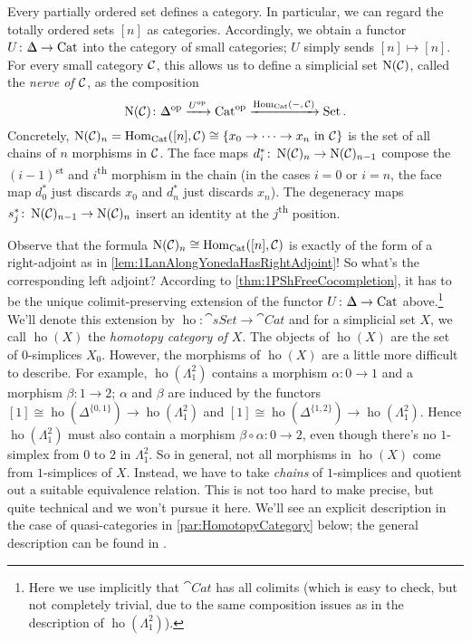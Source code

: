 \begin{numpar}\label{par:Nerve}
	Every partially ordered set defines a category. In particular, we can regard the totally ordered sets $[n]$ as categories. Accordingly, we obtain a functor $U\colon \IDelta\rightarrow \cat{Cat}$ into the category of small categories; $U$ simply sends $[n]\mapsto [n]$. For every small category $\mathcal{C}$, this allows us to define a simplicial set $\operatorname{N}(\mathcal{C})$, called the \emph{nerve of $\mathcal{C}$}, as the composition
	\begin{equation*}
		\N(\Cc)\colon \IDelta^\op\xrightarrow{U^\op}\cat{Cat}^\op\xrightarrow{\Hom_{\cat{Cat}}(-,\,\Cc)}\cat{Set}\,.
	\end{equation*}
	Concretely, $\operatorname{N}(\mathcal{C})_n= \operatorname{Hom}_{\mathrm{Cat}}([n],\mathcal{C})\cong \{x_0\rightarrow \dotsb\rightarrow x_n\text{ in $\mathcal{C}$}\}$ is the set of all chains of $n$ morphisms in $\mathcal{C}$. The face maps $d_i^*\colon \operatorname{N}(\mathcal{C})_n\rightarrow \operatorname{N}(\mathcal{C})_{n-1}$ compose the $(i-1)$\textsuperscript{st} and $i$\textsuperscript{th} morphism in the chain (in the cases $i=0$ or $i=n$, the face map $d_0^*$ just discards $x_0$ and $d_n^*$ just discards $x_n$). The degeneracy maps $s_j^*\colon \operatorname{N}(\mathcal{C})_{n-1}\rightarrow \operatorname{N}(\mathcal{C})_n$ insert an identity at the $j$\textsuperscript{th} position.
	
	Observe that the formula $\operatorname{N}(\mathcal{C})_n\cong\operatorname{Hom}_{\mathrm{Cat}}([n],\mathcal{C})$ is exactly of the form of a right-adjoint as in \cref{lem:1LanAlongYonedaHasRightAdjoint}! So what's the corresponding left adjoint? According to \cref{thm:1PShFreeCocompletion}, it has to be the unique colimit-preserving extension of the functor $U\colon\IDelta\rightarrow \cat{Cat}$ above.\footnote{Here we use implicitly that $\cat{Cat}$ has all colimits (which is easy to check, but not completely trivial, due to the same composition issues as in the description of $\operatorname{ho}(\Lambda_1^2)$).} We'll denote this extension by $\operatorname{ho}\colon \cat{sSet}\rightarrow\cat{Cat}$ and for a simplicial set $X$, we call $\operatorname{ho}(X)$ the \emph{homotopy category of $X$}. The objects of $\operatorname{ho}(X)$ are the set of $0$-simplices $X_0$. However, the morphisms of $\operatorname{ho}(X)$ are a little more difficult to describe. For example, $\operatorname{ho}(\Lambda_1^2)$ contains a morphism $\alpha\colon 0\rightarrow 1$ and a morphism $\beta\colon 1\rightarrow 2$; $\alpha$ and $\beta$ are induced by the functors $[1]\cong \operatorname{ho}(\Delta^{\{0,1\}})\rightarrow \operatorname{ho}(\Lambda_1^2)$ and $[1]\cong \operatorname{ho}(\Delta^{\{1,2\}})\rightarrow \operatorname{ho}(\Lambda_1^2)$. Hence $\operatorname{ho}(\Lambda_1^2)$ must also contain a morphism $\beta\circ\alpha\colon 0\rightarrow 2$, even though there's no $1$-simplex from $0$ to $2$ in $\Lambda_1^2$. So in general, not all morphisms in $\operatorname{ho}(X)$ come from $1$-simplices of $X$. Instead, we have to take \emph{chains} of $1$-simplices and quotient out a suitable equivalence relation. This is not too hard to make precise, but quite technical and we won't pursue it here. We'll see an explicit description in the case of quasi-categories in \cref{par:HomotopyCategory} below; the general description can be found in \cite[Construction/Proposition~II.24]{HigherCatsI}.
\end{numpar}
